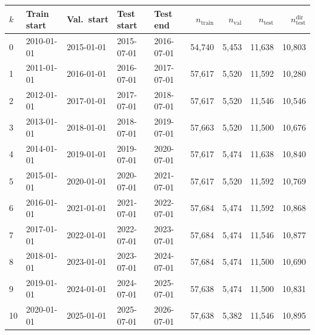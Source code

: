 \begin{tabular}{lllllrrrr}
\toprule
$k$ & Train start & Val.\ start & Test start & Test end & $n_{\text{train}}$ & $n_{\text{val}}$ & $n_{\text{test}}$ & $n_{\text{test}}^{\text{dir}}$ \\
\midrule
0 & 2010-01-01 & 2015-01-01 & 2015-07-01 & 2016-07-01 & 54,740 & 5,453 & 11,638 & 10,803 \\
1 & 2011-01-01 & 2016-01-01 & 2016-07-01 & 2017-07-01 & 57,617 & 5,520 & 11,592 & 10,280 \\
2 & 2012-01-01 & 2017-01-01 & 2017-07-01 & 2018-07-01 & 57,617 & 5,520 & 11,546 & 10,546 \\
3 & 2013-01-01 & 2018-01-01 & 2018-07-01 & 2019-07-01 & 57,663 & 5,520 & 11,500 & 10,676 \\
4 & 2014-01-01 & 2019-01-01 & 2019-07-01 & 2020-07-01 & 57,617 & 5,474 & 11,638 & 10,840 \\
5 & 2015-01-01 & 2020-01-01 & 2020-07-01 & 2021-07-01 & 57,617 & 5,520 & 11,592 & 10,769 \\
6 & 2016-01-01 & 2021-01-01 & 2021-07-01 & 2022-07-01 & 57,684 & 5,474 & 11,592 & 10,868 \\
7 & 2017-01-01 & 2022-01-01 & 2022-07-01 & 2023-07-01 & 57,684 & 5,474 & 11,546 & 10,877 \\
8 & 2018-01-01 & 2023-01-01 & 2023-07-01 & 2024-07-01 & 57,684 & 5,474 & 11,500 & 10,690 \\
9 & 2019-01-01 & 2024-01-01 & 2024-07-01 & 2025-07-01 & 57,638 & 5,474 & 11,500 & 10,831 \\
10 & 2020-01-01 & 2025-01-01 & 2025-07-01 & 2026-07-01 & 57,638 & 5,382 & 11,546 & 10,895 \\
\bottomrule
\end{tabular}
